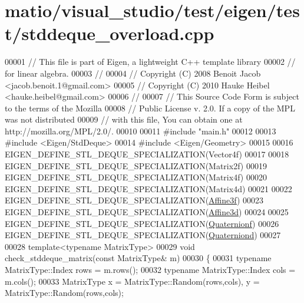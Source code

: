 \hypertarget{matio_2visual__studio_2test_2eigen_2test_2stddeque__overload_8cpp_source}{}\section{matio/visual\+\_\+studio/test/eigen/test/stddeque\+\_\+overload.cpp}
\label{matio_2visual__studio_2test_2eigen_2test_2stddeque__overload_8cpp_source}

\begin{DoxyCode}
00001 \textcolor{comment}{// This file is part of Eigen, a lightweight C++ template library}
00002 \textcolor{comment}{// for linear algebra.}
00003 \textcolor{comment}{//}
00004 \textcolor{comment}{// Copyright (C) 2008 Benoit Jacob <jacob.benoit.1@gmail.com>}
00005 \textcolor{comment}{// Copyright (C) 2010 Hauke Heibel <hauke.heibel@gmail.com>}
00006 \textcolor{comment}{//}
00007 \textcolor{comment}{// This Source Code Form is subject to the terms of the Mozilla}
00008 \textcolor{comment}{// Public License v. 2.0. If a copy of the MPL was not distributed}
00009 \textcolor{comment}{// with this file, You can obtain one at http://mozilla.org/MPL/2.0/.}
00010 
00011 \textcolor{preprocessor}{#include "main.h"}
00012 
00013 \textcolor{preprocessor}{#include <Eigen/StdDeque>}
00014 \textcolor{preprocessor}{#include <Eigen/Geometry>}
00015 
00016 EIGEN\_DEFINE\_STL\_DEQUE\_SPECIALIZATION(Vector4f)
00017 
00018 EIGEN\_DEFINE\_STL\_DEQUE\_SPECIALIZATION(Matrix2f)
00019 EIGEN\_DEFINE\_STL\_DEQUE\_SPECIALIZATION(Matrix4f)
00020 EIGEN\_DEFINE\_STL\_DEQUE\_SPECIALIZATION(Matrix4d)
00021 
00022 EIGEN\_DEFINE\_STL\_DEQUE\_SPECIALIZATION(\hyperlink{group___geometry___module_class_eigen_1_1_transform}{Affine3f})
00023 EIGEN\_DEFINE\_STL\_DEQUE\_SPECIALIZATION(\hyperlink{group___geometry___module_class_eigen_1_1_transform}{Affine3d})
00024 
00025 EIGEN\_DEFINE\_STL\_DEQUE\_SPECIALIZATION(\hyperlink{group___geometry___module_class_eigen_1_1_quaternion}{Quaternionf})
00026 EIGEN\_DEFINE\_STL\_DEQUE\_SPECIALIZATION(\hyperlink{group___geometry___module_class_eigen_1_1_quaternion}{Quaterniond})
00027 
00028 \textcolor{keyword}{template}<\textcolor{keyword}{typename} MatrixType>
00029 \textcolor{keywordtype}{void} check\_stddeque\_matrix(\textcolor{keyword}{const} MatrixType& m)
00030 \{
00031   \textcolor{keyword}{typename} MatrixType::Index rows = m.rows();
00032   \textcolor{keyword}{typename} MatrixType::Index cols = m.cols();
00033   MatrixType x = MatrixType::Random(rows,cols), y = MatrixType::Random(rows,cols);

\end{DoxyCode}
